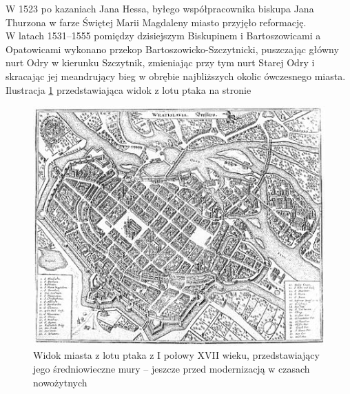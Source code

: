 \documentclass{article}
\begin{document}
W 1523 po kazaniach Jana Hessa, byłego współpracownika biskupa Jana Thurzona w farze Świętej Marii Magdaleny miasto przyjęło reformację.\\
W latach 1531–1555 pomiędzy dzisiejszym Biskupinem i Bartoszowicami a Opatowicami wykonano przekop Bartoszowicko-Szczytnicki, puszczając główny nurt Odry w kierunku Szczytnik, zmieniając przy tym nurt Starej Odry i skracając jej meandrujący bieg w obrębie najbliższych okolic ówczesnego miasta.
\\
Ilustracja \ref{fig:lotptaka} przedstawiająca widok z lotu ptaka na stronie \pageref{fig:lotptaka}
\begin{figure}[h!]
\centering
\includegraphics[scale=1]{450px-Merian_-_Breslau_Kupferstich.jpg}
\caption{Widok miasta z lotu ptaka z I połowy XVII wieku, przedstawiający jego średniowieczne mury – jeszcze przed modernizacją w czasach nowożytnych}
\label{fig:lotptaka}
\end{figure}
\end{document}
